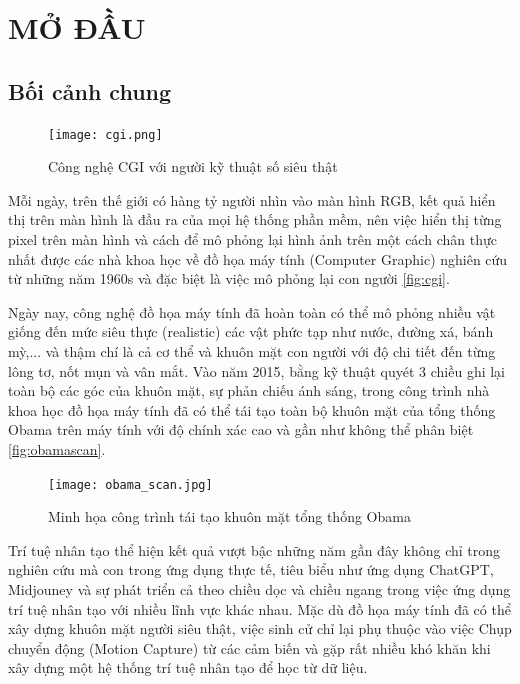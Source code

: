 \chapter{MỞ ĐẦU}
\label{Introduction}

\section{Bối cảnh chung}

\begin{figure}[h!]
  \centering
  \texttt{[image: cgi.png]}
  \caption{Công nghệ CGI với người kỹ thuật số siêu thật}
  \label{fig:cgi}
\end{figure}

Mỗi ngày, trên thế giới có hàng tỷ người nhìn vào màn hình RGB, kết quả hiển thị trên màn hình là đầu ra của mọi hệ thống phần mềm, nên việc hiển thị từng pixel trên màn hình và cách để mô phỏng lại hình ảnh trên một cách chân thực nhất được các nhà khoa học về đồ họa máy tính (Computer Graphic) nghiên cứu từ những năm 1960s và đặc biệt là việc mô phỏng lại con người \autoref{fig:cgi}. 

Ngày nay, công nghệ đồ họa máy tính đã hoàn toàn có thể mô phỏng nhiều vật giống đến mức siêu thực (realistic) các vật phức tạp như nước, đường xá, bánh mỳ,...  và thậm chí là cả cơ thể và khuôn mặt con người với độ chi tiết đến từng lông tơ, nốt mụn và vân mắt. 
Vào năm 2015, bằng kỹ thuật quyét 3 chiều ghi lại toàn bộ các góc của khuôn mặt, sự phản chiếu ánh sáng, trong công trình \cite{metallo2015scanning}
nhà khoa học đồ họa máy tính đã có thể tái tạo toàn bộ khuôn mặt của tổng thống Obama trên máy tính với độ chính xác cao và gần như không thể phân biệt \autoref{fig:obamascan}.

\begin{figure}
    \centering
    \texttt{[image: obama\_scan.jpg]}
    \caption{Minh họa công trình tái tạo khuôn mặt tổng thống Obama}
    \label{fig:obamascan}
\end{figure}

Trí tuệ nhân tạo thể hiện kết quả vượt bậc những năm gần đây không chỉ trong nghiên cứu mà con trong ứng dụng thực tế, tiêu biểu như ứng dụng ChatGPT, Midjouney và sự phát triển cả theo chiều dọc và chiều ngang trong việc ứng dụng trí tuệ nhân tạo với nhiều lĩnh vực khác nhau. Mặc dù đồ họa máy tính đã có thể xây dựng khuôn mặt người siêu thật, việc sinh cử chỉ lại phụ thuộc vào việc Chụp chuyển động (Motion Capture) từ các cảm biến và gặp rất nhiều khó khăn khi xây dựng một hệ thống trí tuệ nhân tạo để học từ dữ liệu.

